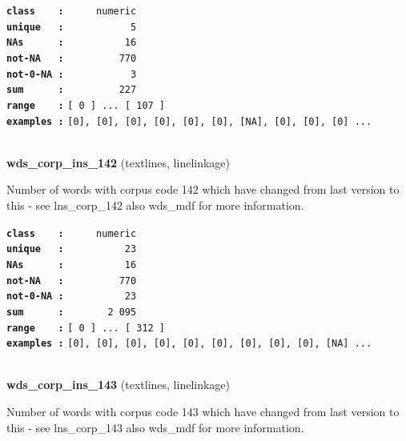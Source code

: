 \documentclass[]{article}
\begin{document}
\textbf{\texttt{class\ \ \ \ :}} \texttt{~~~~~numeric}\\
\textbf{\texttt{unique\ \ \ :}} \texttt{~~~~~~~~~~~5}\\
\textbf{\texttt{NAs\ \ \ \ \ \ :}} \texttt{~~~~~~~~~~16}\\
\textbf{\texttt{not-NA\ \ \ :}} \texttt{~~~~~~~~~770}\\
\textbf{\texttt{not-0-NA\ :}} \texttt{~~~~~~~~~~~3}\\
\textbf{\texttt{sum\ \ \ \ \ \ :}} \texttt{~~~~~~~~~227}\\
\textbf{\texttt{range\ \ \ \ :}}
\texttt{{[}\ 0\ {]}\ ...\ {[}\ 107\ {]}}\\
\textbf{\texttt{examples\ :}}
\texttt{{[}0{]},\ {[}0{]},\ {[}0{]},\ {[}0{]},\ {[}0{]},\ {[}0{]},\ {[}NA{]},\ {[}0{]},\ {[}0{]},\ {[}0{]}\ ...}\\

~

\textbf{wds\_corp\_ins\_142} (textlines, linelinkage)

Number of words with corpus code 142 which have changed from last
version to this - see lns\_corp\_142 also wds\_mdf for more information.

\textbf{\texttt{class\ \ \ \ :}} \texttt{~~~~~numeric}\\
\textbf{\texttt{unique\ \ \ :}} \texttt{~~~~~~~~~~23}\\
\textbf{\texttt{NAs\ \ \ \ \ \ :}} \texttt{~~~~~~~~~~16}\\
\textbf{\texttt{not-NA\ \ \ :}} \texttt{~~~~~~~~~770}\\
\textbf{\texttt{not-0-NA\ :}} \texttt{~~~~~~~~~~23}\\
\textbf{\texttt{sum\ \ \ \ \ \ :}} \texttt{~~~~~~~2~095}\\
\textbf{\texttt{range\ \ \ \ :}}
\texttt{{[}\ 0\ {]}\ ...\ {[}\ 312\ {]}}\\
\textbf{\texttt{examples\ :}}
\texttt{{[}0{]},\ {[}0{]},\ {[}0{]},\ {[}0{]},\ {[}0{]},\ {[}0{]},\ {[}0{]},\ {[}0{]},\ {[}0{]},\ {[}NA{]}\ ...}\\

~

\textbf{wds\_corp\_ins\_143} (textlines, linelinkage)

Number of words with corpus code 143 which have changed from last
version to this - see lns\_corp\_143 also wds\_mdf for more information.
\end{document}
